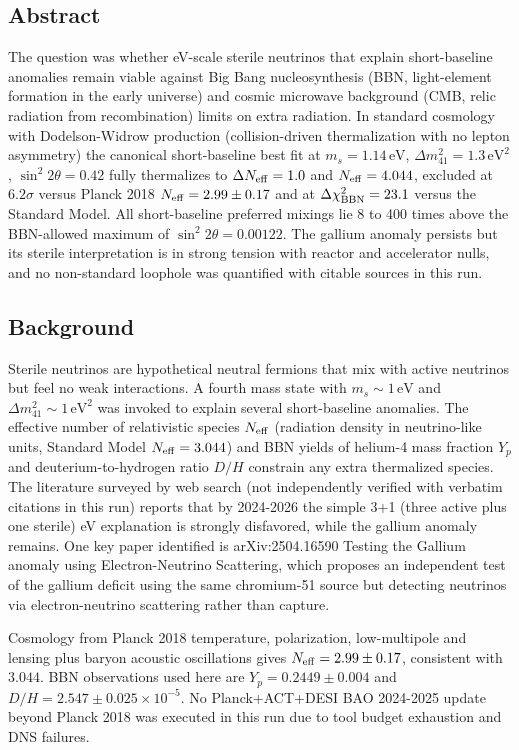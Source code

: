 \documentclass[11pt,a4paper]{article}
\begin{document}
\subsection{Abstract}
The question was whether eV-scale sterile neutrinos that explain short-baseline anomalies remain viable against Big Bang nucleosynthesis (BBN, light-element formation in the early universe) and cosmic microwave background (CMB, relic radiation from recombination) limits on extra radiation. In standard cosmology with Dodelson-Widrow production (collision-driven thermalization with no lepton asymmetry) the canonical short-baseline best fit at $m_s = 1.14\,\mathrm{eV}$, $\Delta m^2_{41} = 1.3\,\mathrm{eV}^2$, $\sin^2 2\theta = 0.42$ fully thermalizes to $\Delta N_{\rm eff} = 1.0$ and $N_{\rm eff} = 4.044$, excluded at $6.2\sigma$ versus Planck 2018 $N_{\rm eff} = 2.99 \pm 0.17$ and at $\Delta\chi^2_{\rm BBN} = 23.1$ versus the Standard Model. All short-baseline preferred mixings lie 8 to 400 times above the BBN-allowed maximum of $\sin^2 2\theta = 0.00122$. The gallium anomaly persists but its sterile interpretation is in strong tension with reactor and accelerator nulls, and no non-standard loophole was quantified with citable sources in this run.

\subsection{Background}
Sterile neutrinos are hypothetical neutral fermions that mix with active neutrinos but feel no weak interactions. A fourth mass state with $m_s \sim 1\,\mathrm{eV}$ and $\Delta m^2_{41} \sim 1\,\mathrm{eV}^2$ was invoked to explain several short-baseline anomalies. The effective number of relativistic species $N_{\rm eff}$ (radiation density in neutrino-like units, Standard Model $N_{\rm eff} = 3.044$) and BBN yields of helium-4 mass fraction $Y_p$ and deuterium-to-hydrogen ratio $D/H$ constrain any extra thermalized species. The literature surveyed by web search (not independently verified with verbatim citations in this run) reports that by 2024-2026 the simple 3+1 (three active plus one sterile) eV explanation is strongly disfavored, while the gallium anomaly remains. One key paper identified is arXiv:2504.16590 Testing the Gallium anomaly using Electron-Neutrino Scattering, which proposes an independent test of the gallium deficit using the same chromium-51 source but detecting neutrinos via electron-neutrino scattering rather than capture.

Cosmology from Planck 2018 temperature, polarization, low-multipole and lensing plus baryon acoustic oscillations gives $N_{\rm eff} = 2.99 \pm 0.17$, consistent with $3.044$. BBN observations used here are $Y_p = 0.2449 \pm 0.004$ and $D/H = 2.547 \pm 0.025 \times 10^{-5}$. No Planck+ACT+DESI BAO 2024-2025 update beyond Planck 2018 was executed in this run due to tool budget exhaustion and DNS failures.
\end{document}

